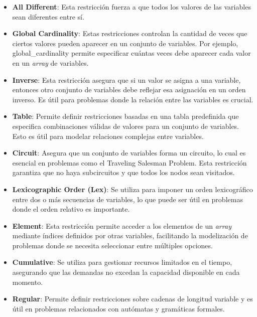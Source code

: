 \documentclass[runningheads]{llncs}
\begin{document}
\begin{itemize}
    \item \textbf{All Different}: Esta restricción fuerza a que todos los valores de las variables sean diferentes entre sí.
    \item \textbf{Global Cardinality}: Estas restricciones controlan la cantidad de veces que ciertos valores pueden aparecer en un conjunto de variables. Por ejemplo, global\_cardinality permite especificar cuántas veces debe aparecer cada valor en un \textit{array} de variables.
    \item \textbf{Inverse}: Esta restricción asegura que si un valor se asigna a una variable, entonces otro conjunto de variables debe reflejar esa asignación en un orden inverso. Es útil para problemas donde la relación entre las variables es crucial.
    \item \textbf{Table}: Permite definir restricciones basadas en una tabla predefinida que especifica combinaciones válidas de valores para un conjunto de variables. Esto es útil para modelar relaciones complejas entre variables.
    \item \textbf{Circuit}: Asegura que un conjunto de variables forma un circuito, lo cual es esencial en problemas como el Traveling Salesman Problem. Esta restricción garantiza que no haya subcircuitos y que todos los nodos sean visitados.
    \item \textbf{Lexicographic Order (Lex)}: Se utiliza para imponer un orden lexicográfico entre dos o más secuencias de variables, lo que puede ser útil en problemas donde el orden relativo es importante.
    \item \textbf{Element}: Esta restricción permite acceder a los elementos de un \textit{array} mediante índices definidos por otras variables, facilitando la modelización de problemas donde se necesita seleccionar entre múltiples opciones.
    \item \textbf{Cumulative}: Se utiliza para gestionar recursos limitados en el tiempo, asegurando que las demandas no excedan la capacidad disponible en cada momento.
    \item \textbf{Regular}: Permite definir restricciones sobre cadenas de longitud variable y es útil en problemas relacionados con autómatas y gramáticas formales.
    
\end{itemize}

\end{document}
